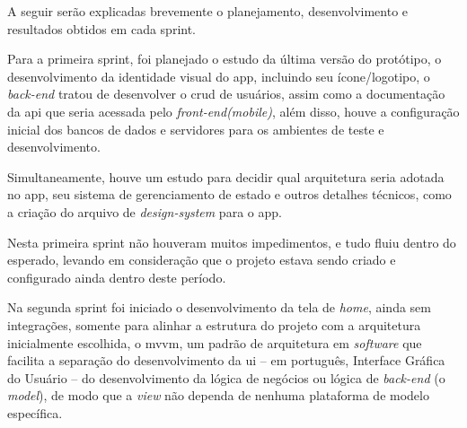 A seguir serão explicadas brevemente o planejamento, desenvolvimento e resultados obtidos em cada sprint.


Para a primeira sprint, foi planejado o estudo da última versão do protótipo, o desenvolvimento da identidade visual do \ac{app}, incluindo seu ícone/logotipo, o \textit{back-end} tratou de desenvolver o \ac{crud} de usuários, assim como a documentação da \ac{api} que seria acessada pelo \textit{front-end(mobile)}, além disso, houve a configuração inicial dos bancos de dados e servidores para os ambientes de teste e desenvolvimento.

Simultaneamente, houve um estudo para decidir qual arquitetura seria adotada no \ac{app}, seu sistema de gerenciamento de estado e outros detalhes técnicos, como a criação do arquivo de \textit{design-system} para o \ac{app}. 

Nesta primeira sprint não houveram muitos impedimentos, e tudo fluiu dentro do esperado, levando em consideração que o projeto estava sendo criado e configurado ainda dentro deste período.

Na segunda sprint foi iniciado o desenvolvimento da tela de \textit{home}, ainda sem integrações, somente para alinhar a estrutura do projeto com a arquitetura inicialmente escolhida, o \ac{mvvm}, um padrão de arquitetura em \textit{software} que facilita a separação do desenvolvimento da \ac{ui} – em português, Interface Gráfica do Usuário – do desenvolvimento da lógica de negócios ou lógica de \textit{back-end} (o \textit{model}), de modo que a \textit{view} não dependa de nenhuma plataforma de modelo específica.

